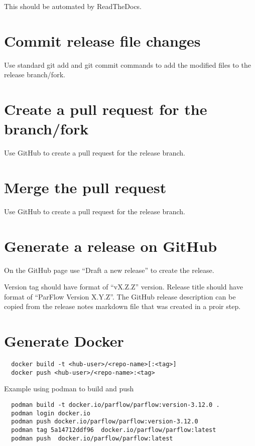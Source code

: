 This should be automated by ReadTheDocs.
  
\section{Commit release file changes}

Use standard git add and git commit commands to add the modified files
to the release branch/fork.

\section{Create a pull request for the branch/fork}

Use GitHub to create a pull request for the release branch.
  
\section{Merge the pull request}

Use GitHub to create a pull request for the release branch.
  
\section{Generate a release on GitHub}

On the GitHub  page use
``Draft a new release'' to create the release.

Version tag should have format of ``vX.Z.Z'' version.  Release title
should have format of ``ParFlow Version X.Y.Z''.  The GitHub release
description can be copied from the release notes markdown file that
was created in a proir step.

\section{Generate Docker}

\begin{display}\begin{verbatim}
  docker build -t <hub-user>/<repo-name>[:<tag>]
  docker push <hub-user>/<repo-name>:<tag>
\end{verbatim}\end{display}

Example using podman to build and push

\begin{display}\begin{verbatim}
  podman build -t docker.io/parflow/parflow:version-3.12.0 .
  podman login docker.io
  podman push docker.io/parflow/parflow:version-3.12.0
  podman tag 5a14712ddf96  docker.io/parflow/parflow:latest
  podman push  docker.io/parflow/parflow:latest
\end{verbatim}\end{display}
  
